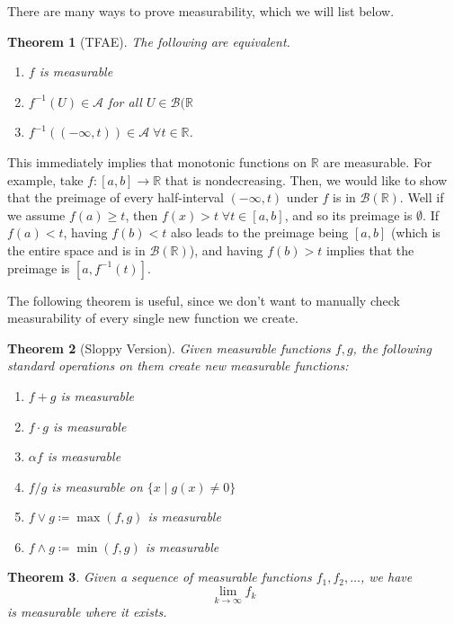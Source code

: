 \documentclass{article}
\newtheorem{theorem}{Theorem}[section]
\theoremstyle{remark}
\theoremstyle{definition}
\begin{document}
There are many ways to prove measurability, which we will list below. 

\begin{theorem}[TFAE]
The following are equivalent. 
\begin{enumerate}
    \item $f$ is measurable 
    \item $f^{-1} (U) \in \mathcal{A}$ for all $U \in \mathcal{B}(\mathbb{R}$ 
    \item $f^{-1}((-\infty, t)) \in \mathcal{A} \; \forall t \in \mathbb{R}$. 
\end{enumerate}
\end{theorem}

This immediately implies that monotonic functions on $\mathbb{R}$ are measurable. For example, take $f: [a, b] \longrightarrow \mathbb{R}$ that is nondecreasing. Then, we would like to show that the preimage of every half-interval $(-\infty, t)$ under $f$ is in $\mathcal{B}(\mathbb{R})$. Well if we assume $f(a) \geq t$, then $f(x) > t \; \forall t \in [a, b]$, and so its preimage is $\emptyset$. If $f(a) < t$, having $f(b) < t$ also leads to the preimage being $[a, b]$ (which is the entire space and is in $\mathcal{B}(\mathbb{R})$), and having $f(b) > t$ implies that the preimage is $[a, f^{-1}(t)]$. 

The following theorem is useful, since we don't want to manually check measurability of every single new function we create. 

\begin{theorem}[Sloppy Version]
Given measurable functions $f, g$, the following standard operations on them create new measurable functions: 
\begin{enumerate}
    \item $f + g$ is measurable 
    \item $f \cdot g$ is measurable 
    \item $\alpha f$ is measurable 
    \item $f / g$ is measurable on $\{x \mid g(x) \neq 0\}$ 
    \item $f \vee g \coloneqq \max (f, g)$ is measurable 
    \item $f \wedge g \coloneqq \min (f, g)$ is measurable 
\end{enumerate}
\end{theorem}

\begin{theorem}
Given a sequence of measurable functions $f_1, f_2, \ldots$, we have 
\[\lim_{k \rightarrow \infty} f_k\]
is measurable where it exists. 
\end{theorem}
\end{document}
